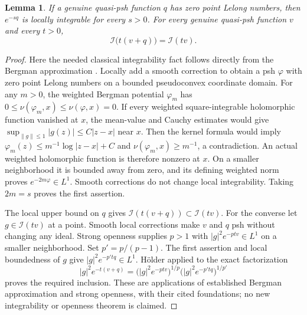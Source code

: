 \documentclass[11pt]{article}
\newtheorem{lemma}[theorem]{Lemma}
\theoremstyle{remark}
\begin{document}
\begin{lemma}\label{lem:ideal-neutral}
If a genuine quasi-psh function $q$ has zero point Lelong numbers, then
$e^{-s q}$ is locally integrable for every $s>0$. For every genuine
quasi-psh function $v$ and every $t>0$,
\[
 \mathcal I\bigl(t(v+q)\bigr)=\mathcal I(tv).
\]
\end{lemma}
\begin{proof}
Here the needed classical integrability fact follows directly from the
Bergman approximation \cite[Theorem~1.2]{DemaillyBergman}. Locally add
a smooth correction to obtain a psh $\varphi$ with zero point Lelong
numbers on a bounded pseudoconvex coordinate domain. For any $m>0$,
the weighted Bergman potential $\varphi_m$ has
$0\leq\nu(\varphi_m,x)\leq\nu(\varphi,x)=0$.
If every weighted square-integrable holomorphic function vanished at $x$,
the mean-value and Cauchy estimates would give
$\sup_{\|g\|\leq1}|g(z)|\leq C|z-x|$ near $x$.
Then the kernel formula would imply
$\varphi_m(z)\leq m^{-1}\log|z-x|+C$ and
$\nu(\varphi_m,x)\geq m^{-1}$, a contradiction.
An actual weighted holomorphic function is therefore nonzero at $x$.
On a smaller neighborhood it is bounded away from zero, and its defining
weighted norm proves $e^{-2m\varphi}\in L^1$. Smooth corrections do not
change local integrability. Taking $2m=s$ proves the first assertion.

The local upper bound on $q$ gives
$\mathcal I(t(v+q))\subset\mathcal I(tv)$.
For the converse let $g\in\mathcal I(tv)$ at a point. Smooth local
corrections make $v$ and $q$ psh without changing any ideal. Strong
openness \cite[Corollary~2.3]{DemaillyBergman} supplies $p>1$ with
$|g|^2e^{-ptv}\in L^1$ on a smaller neighborhood.
Set $p'=p/(p-1)$. The first assertion and local boundedness of $g$ give
$|g|^2e^{-p'tq}\in L^1$. H\"older applied to the exact factorization
\[
 |g|^2e^{-t(v+q)}
   =\bigl(|g|^2e^{-ptv}\bigr)^{1/p}
      \bigl(|g|^2e^{-p'tq}\bigr)^{1/p'}
\]
proves the required inclusion. These are applications of established
Bergman approximation and strong openness, with their cited foundations;
no new integrability or openness theorem is claimed.
\end{proof}
\end{document}
